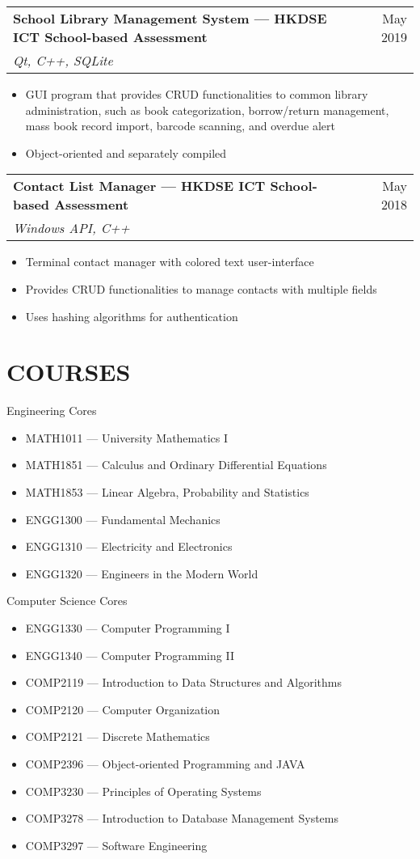 \documentclass{article}
\newcommand{\jobTitle}[3]{
\begin{tabularx}{\linewidth}{ X r }
    \textbf{#1} & #2\\
    \textit{#3} &
\end{tabularx}
}
\begin{document}
\jobTitle
{School Library Management System --- HKDSE ICT School-based Assessment}
{May 2019}
{Qt, C++, SQLite}
\begin{itemize}
    \item GUI program that provides CRUD functionalities to common library administration, such as book categorization, borrow/return management, mass book record import, barcode scanning, and overdue alert
    \item Object-oriented and separately compiled
\end{itemize}

\jobTitle
{Contact List Manager --- HKDSE ICT School-based Assessment}
{May 2018}
{Windows API, C++}
\begin{itemize}
    \item Terminal contact manager with colored text user-interface
    \item Provides CRUD functionalities to manage contacts with multiple fields
    \item Uses hashing algorithms for authentication
\end{itemize}

\section{COURSES}
\vspace{0.3cm}

Engineering Cores
\begin{itemize}
    \item[] MATH1011 --- University Mathematics I
    \item[] MATH1851 --- Calculus and Ordinary Differential Equations
    \item[] MATH1853 --- Linear Algebra, Probability and Statistics
    \item[] ENGG1300 --- Fundamental Mechanics
    \item[] ENGG1310 --- Electricity and Electronics
    \item[] ENGG1320 --- Engineers in the Modern World
\end{itemize}

Computer Science Cores
\begin{itemize}
    \item[] ENGG1330 --- Computer Programming I
    \item[] ENGG1340 --- Computer Programming II
    \item[] COMP2119 --- Introduction to Data Structures and Algorithms
    \item[] COMP2120 --- Computer Organization
    \item[] COMP2121 --- Discrete Mathematics
    \item[] COMP2396 --- Object-oriented Programming and JAVA
    \item[] COMP3230 --- Principles of Operating Systems
    \item[] COMP3278 --- Introduction to Database Management Systems
    \item[] COMP3297 --- Software Engineering
\end{itemize}
\end{document}
